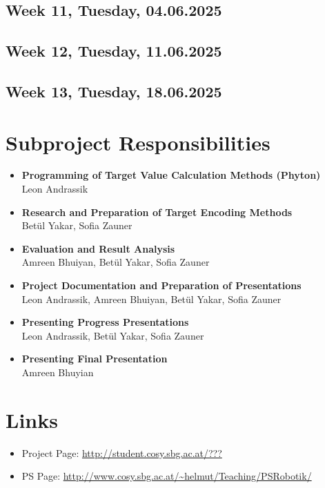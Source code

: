 \documentclass[12pt,fleqn,a4paper]{article}
\begin{document}
\subsection{Week 11, Tuesday, 04.06.2025}

\subsection{Week 12, Tuesday, 11.06.2025}

\subsection{Week 13, Tuesday, 18.06.2025}

\newpage

\section{Subproject Responsibilities} %

\begin{itemize}
\item{\textbf{Programming of Target Value Calculation Methods (Phyton)} \\
 Leon Andrassik }
\item{\textbf{Research and Preparation of Target Encoding Methods} \\
\indent Bet\"ul Yakar, Sofia Zauner}
\item{\textbf{Evaluation and Result Analysis} \\
\indent Amreen Bhuiyan, Bet\"ul Yakar, Sofia Zauner}
\item{\textbf{Project Documentation and Preparation of Presentations} \\
\indent Leon Andrassik, Amreen Bhuiyan, Bet\"ul Yakar, Sofia Zauner }
\item{\textbf{Presenting Progress Presentations} \\
\indent Leon Andrassik, Bet\"ul Yakar, Sofia Zauner }
\item{\textbf{Presenting Final Presentation} \\
\indent Amreen Bhuyian }
\end{itemize}

\newpage

\section{Links}

\begin{itemize}
\item Project Page: \url{http://student.cosy.sbg.ac.at/???}
\item PS Page:
\url{http://www.cosy.sbg.ac.at/~helmut/Teaching/PSRobotik/}

\end{itemize}

\end{document}
